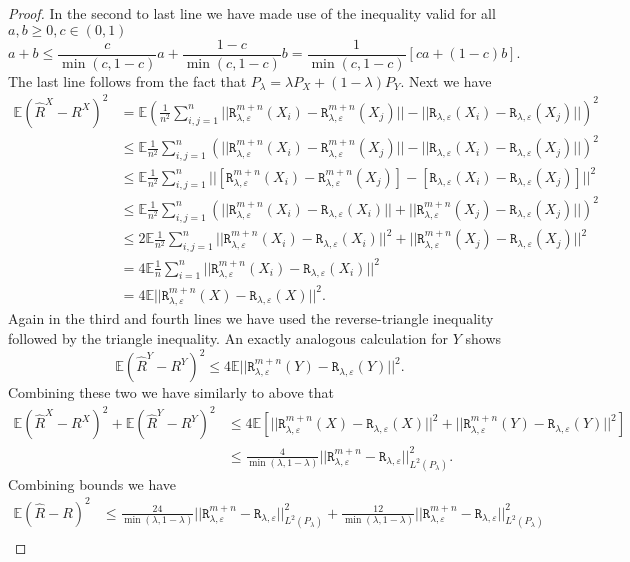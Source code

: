 \documentclass{article}
\theoremstyle{definition}
\newcommand{\sR}{\mathtt{R}_{\lambda,\varepsilon}}
\newcommand{\sRn}{\mathtt{R}_{\lambda,\varepsilon}^{m+n}}
\begin{document}
\begin{proof}
    In the second to last line we have made use of the inequality valid for all $a,b \geq 0, c \in (0,1)$
    $$
    a + b \leq \frac{c}{\min(c, 1-c)}a + \frac{1-c}{\min(c,1-c)}b = \frac{1}{\min(c, 1-c)}\left [ca + (1-c)b \right ].
    $$
    The last line follows from the fact that $P_\lambda = \lambda P_X + (1-\lambda)P_Y$. 
    Next we have
    \begin{align*}
        \mathbb{E}(\hat{R}^X - R^X)^2 &= \mathbb{E} \left (\frac{1}{n^2} \sum_{i,j=1}^n ||\sRn(X_i) - \sRn(X_j)|| - ||\sR(X_i) - \sR(X_j)||  \right )^2 \\
        &\leq \mathbb{E}\frac{1}{n^2} \sum_{i,j=1}^n \left ( ||\sRn(X_i) - \sRn(X_j)|| - ||\sR(X_i) - \sR(X_j)|| \right )^2 \\
        &\leq \mathbb{E}\frac{1}{n^2} \sum_{i,j=1}^n  ||[\sRn(X_i) - \sRn(X_j)] - [\sR(X_i) - \sR(X_j)]||^2 \\ 
        &\leq \mathbb{E}\frac{1}{n^2} \sum_{i,j=1}^n  \left ( ||\sRn(X_i) - \sR(X_i)|| +  ||\sRn(X_j) - \sR(X_j)|| \right ) ^2 \\ 
        &\leq 2\mathbb{E} \frac{1}{n^2} \sum_{i,j=1}^n  ||\sRn(X_i) - \sR(X_i)||^2 +  ||\sRn(X_j) - \sR(X_j)||^2 \\
        &= 4\mathbb{E} \frac{1}{n}\sum_{i=1}^n  ||\sRn(X_i) - \sR(X_i)||^2 \\
        &= 4 \mathbb{E} ||\sRn(X) - \sR(X)||^2.
    \end{align*} 
    Again in the third and fourth lines we have used the reverse-triangle inequality followed by the triangle inequality.
    An exactly analogous calculation for $Y$ shows
    \begin{equation*}
        \mathbb{E}(\hat{R}^Y - R^Y)^2 \leq 4\mathbb{E} ||\sRn(Y) - \sR(Y)||^2.
    \end{equation*}
    Combining these two we have similarly to above that
    \begin{align*}
        \mathbb{E}(\hat{R}^X - R^X)^2 + \mathbb{E}(\hat{R}^Y - R^Y)^2 &\leq 4\mathbb{E} \left [ ||\sRn(X) - \sR(X)||^2 + ||\sRn(Y) - \sR(Y)||^2 \right ] \\
        &\leq \frac{4}{\min(\lambda, 1-\lambda)} ||\sRn - \sR||_{L^2(P_\lambda)}^2.
    \end{align*}
    Combining bounds we have
    \begin{align*}
        \mathbb{E}(\hat{R} - R)^2 &\leq \frac{24}{\min(\lambda, 1-\lambda)}||\sRn - \sR||_{L^2(P_\lambda)}^2 + \frac{12}{\min(\lambda, 1-\lambda)}||\sRn - \sR||_{L^2(P_\lambda)}^2 \\

\end{align*}
\end{proof}
\end{document}
